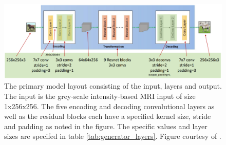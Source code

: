 \documentclass[12pt, fleqn, titlepage]{article}
\newcommand{\1}[1]{\mathds{1}\left[#1\right]}
\begin{document}
\begin{figure}[H]
	\centering
	\includegraphics[width=0.7\linewidth]{imgs/cyclegan_generator_layers}
	\caption{The primary model layout consisting of the input, layers and output. The input is the grey-scale intensity-based MRI input of size 1x256x256. The five encoding and decoding convolutional layers as well as the residual blocks each have a specified kernel size, stride and padding as noted in the figure. The specific values and layer sizes are specifed in table \ref{tab:generator_layers}. Figure courtesy of \cite{cyclegan_figures}.}
	\label{fig:cyclegangeneratorlayers}
\end{figure}
\end{document}
